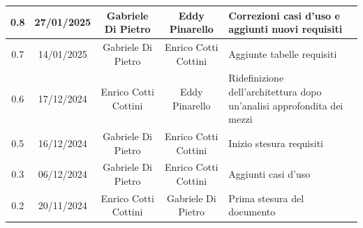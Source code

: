 \documentclass{article}
\begin{document}
\begin{table}[h]
\begin{tabular}{|c|c|c|c|m{}|}
        \hline
        0.8 & 27/01/2025 & Gabriele Di Pietro & Eddy Pinarello & Correzioni casi d'uso e aggiunti nuovi requisiti \\
        \hline
        0.7 & 14/01/2025 & Gabriele Di Pietro & Enrico Cotti Cottini & Aggiunte tabelle requisiti \\
        \hline
        0.6 & 17/12/2024 & Enrico Cotti Cottini & Eddy Pinarello & Ridefinizione dell'architettura dopo un'analisi approfondita dei mezzi \\
        \hline
        0.5 & 16/12/2024 & Gabriele Di Pietro & Enrico Cotti Cottini & Inizio stesura requisiti \\
        \hline
        0.3 & 06/12/2024 & Gabriele Di Pietro & Enrico Cotti Cottini & Aggiunti casi d'uso \\
        \hline
        0.2 & 20/11/2024 & Enrico Cotti Cottini & Gabriele Di Pietro & Prima stesura del documento \\
        \hline
    \end{tabular}
\end{table}


\newpage
\tableofcontents
\listoftables
\listoffigures

\newpage



\newpage



\newpage



\newpage


\end{document}
